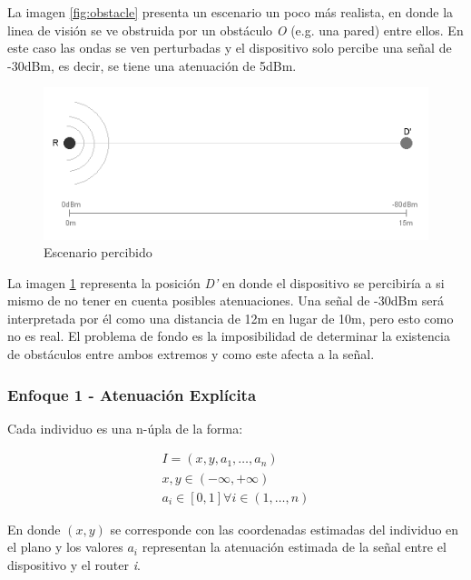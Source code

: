 \documentclass[journal]{IEEEtran}
\begin{document}
La imagen \ref{fig:obstacle} presenta un escenario un poco más realista, en donde la linea de visión se ve obstruida por un obstáculo \emph{O} (e.g. una pared) entre ellos. En este caso las ondas se ven perturbadas y el dispositivo solo percibe una señal de -30dBm, es decir, se tiene una atenuación de 5dBm.\\

\begin{figure}[h]
\centering
\includegraphics[width=\linewidth]{perceived.png}
\caption{Escenario percibido}
\label{fig:perceived}
\end{figure}

La imagen \ref{fig:perceived} representa la posición \emph{D'} en donde el dispositivo se percibiría a si mismo de no tener en cuenta posibles atenuaciones. Una señal de -30dBm será interpretada por él como una distancia de 12m en lugar de 10m, pero esto como no es real. El problema de fondo es la imposibilidad de determinar la existencia de obstáculos entre ambos extremos y como este afecta a la señal.\\

\subsubsection{Enfoque 1 - Atenuación Explícita}

Cada individuo es una n-úpla de la forma:

\begin{gather*}
I = (x, y, a_1, \dots, a_n)\\
x, y \in (-\infty, +\infty)\\
a_i \in [0, 1] \forall i \in (1, \dots, n)
\end{gather*}

En donde $(x,y)$ se corresponde con las coordenadas estimadas del individuo en el plano y los valores $a_i$ representan la atenuación estimada de la señal entre el dispositivo y el router \textit{i}.\\
\end{document}
